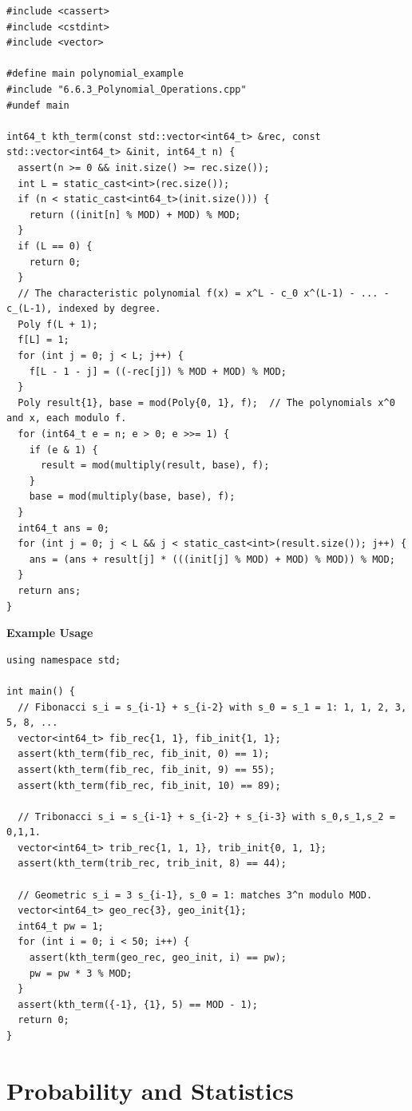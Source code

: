 \begin{lstlisting}[style=cpp]
#include <cassert>
#include <cstdint>
#include <vector>

#define main polynomial_example
#include "6.6.3_Polynomial_Operations.cpp"
#undef main

int64_t kth_term(const std::vector<int64_t> &rec, const std::vector<int64_t> &init, int64_t n) {
  assert(n >= 0 && init.size() >= rec.size());
  int L = static_cast<int>(rec.size());
  if (n < static_cast<int64_t>(init.size())) {
    return ((init[n] % MOD) + MOD) % MOD;
  }
  if (L == 0) {
    return 0;
  }
  // The characteristic polynomial f(x) = x^L - c_0 x^(L-1) - ... - c_(L-1), indexed by degree.
  Poly f(L + 1);
  f[L] = 1;
  for (int j = 0; j < L; j++) {
    f[L - 1 - j] = ((-rec[j]) % MOD + MOD) % MOD;
  }
  Poly result{1}, base = mod(Poly{0, 1}, f);  // The polynomials x^0 and x, each modulo f.
  for (int64_t e = n; e > 0; e >>= 1) {
    if (e & 1) {
      result = mod(multiply(result, base), f);
    }
    base = mod(multiply(base, base), f);
  }
  int64_t ans = 0;
  for (int j = 0; j < L && j < static_cast<int>(result.size()); j++) {
    ans = (ans + result[j] * (((init[j] % MOD) + MOD) % MOD)) % MOD;
  }
  return ans;
}
\end{lstlisting}
\textbf{Example Usage}\par
\begin{lstlisting}[style=cpp]
using namespace std;

int main() {
  // Fibonacci s_i = s_{i-1} + s_{i-2} with s_0 = s_1 = 1: 1, 1, 2, 3, 5, 8, ...
  vector<int64_t> fib_rec{1, 1}, fib_init{1, 1};
  assert(kth_term(fib_rec, fib_init, 0) == 1);
  assert(kth_term(fib_rec, fib_init, 9) == 55);
  assert(kth_term(fib_rec, fib_init, 10) == 89);

  // Tribonacci s_i = s_{i-1} + s_{i-2} + s_{i-3} with s_0,s_1,s_2 = 0,1,1.
  vector<int64_t> trib_rec{1, 1, 1}, trib_init{0, 1, 1};
  assert(kth_term(trib_rec, trib_init, 8) == 44);

  // Geometric s_i = 3 s_{i-1}, s_0 = 1: matches 3^n modulo MOD.
  vector<int64_t> geo_rec{3}, geo_init{1};
  int64_t pw = 1;
  for (int i = 0; i < 50; i++) {
    assert(kth_term(geo_rec, geo_init, i) == pw);
    pw = pw * 3 % MOD;
  }
  assert(kth_term({-1}, {1}, 5) == MOD - 1);
  return 0;
}
\end{lstlisting}

\section{\texorpdfstring{Probability and Statistics}{6.7 Probability and Statistics}}
\setcounter{section}{7}
\setcounter{subsection}{0}
